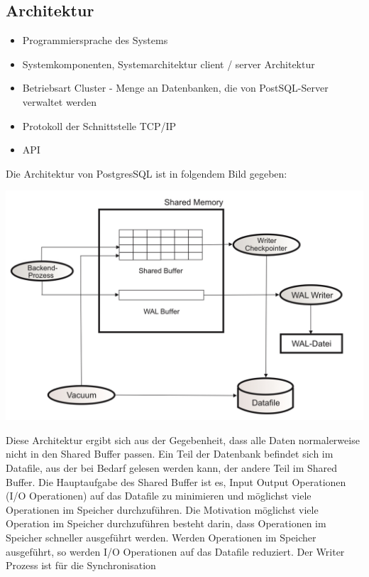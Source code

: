 \subsection{Architektur}
    \begin{itemize}
        \item Programmiersprache des Systems
        \item Systemkomponenten, Systemarchitektur
        \subitem client / server Architektur \cite{postgresqldoc}
        \item Betriebsart
            \subitem Cluster - Menge an Datenbanken, die von PostSQL-Server verwaltet werden \cite{froehlich01}
        \item Protokoll der Schnittstelle
        \subitem TCP/IP
        \item API
    \end{itemize}
    Die Architektur von PostgresSQL ist in folgendem Bild gegeben:
    \begin{center}
        \includegraphics[width = \linewidth]{./images/PostgresSQLArchitektur.jpg}
    \end{center}
    Diese Architektur ergibt sich aus der Gegebenheit, dass alle Daten normalerweise nicht in den Shared Buffer passen. Ein Teil der Datenbank befindet sich im Datafile, aus der bei Bedarf gelesen werden kann, der andere Teil im Shared Buffer.
    Die Hauptaufgabe des Shared Buffer ist es, Input Output Operationen (I/O Operationen) auf das Datafile zu minimieren und möglichst viele Operationen im Speicher durchzuführen. Die Motivation möglichst viele Operation im Speicher durchzuführen
    besteht darin, dass Operationen im Speicher schneller ausgeführt werden. Werden Operationen im Speicher ausgeführt, so werden I/O Operationen auf das Datafile reduziert. Der Writer Prozess ist für die Synchronisation
